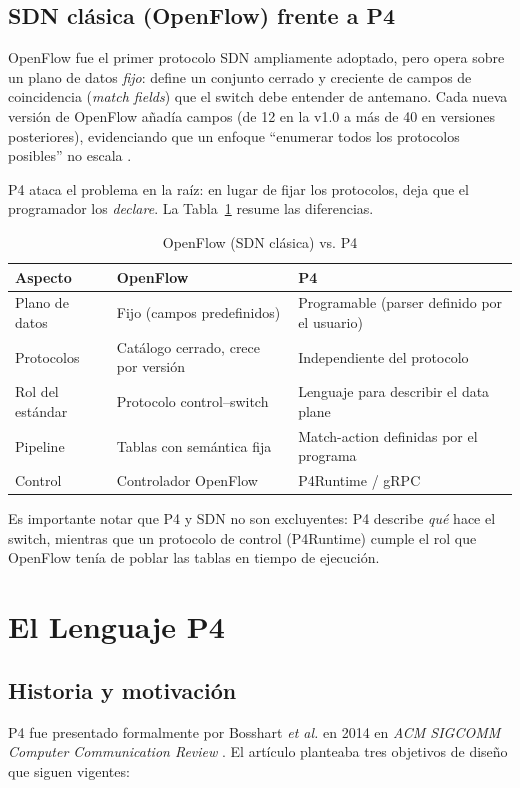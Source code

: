 \documentclass[conference,onecolumn,10pt]{IEEEtran}
\begin{document}
\subsection{SDN clásica (OpenFlow) frente a P4}
OpenFlow fue el primer protocolo SDN ampliamente adoptado, pero opera sobre un
plano de datos \emph{fijo}: define un conjunto cerrado y creciente de campos de
coincidencia (\emph{match fields}) que el switch debe entender de antemano. Cada
nueva versión de OpenFlow añadía campos (de 12 en la v1.0 a más de 40 en
versiones posteriores), evidenciando que un enfoque ``enumerar todos los
protocolos posibles'' no escala \cite{bosshart2014p4}.

P4 ataca el problema en la raíz: en lugar de fijar los protocolos, deja que el
programador los \emph{declare}. La Tabla~\ref{tab:openflow-p4} resume las
diferencias.

\begin{table}[t]
\caption{OpenFlow (SDN clásica) vs. P4}
\label{tab:openflow-p4}
\centering
\small
\begin{tabular}{@{}p{2.4cm}p{2.5cm}p{2.6cm}@{}}
\toprule
\textbf{Aspecto} & \textbf{OpenFlow} & \textbf{P4} \\
\midrule
Plano de datos & Fijo (campos predefinidos) & Programable (parser definido por el usuario) \\
Protocolos & Catálogo cerrado, crece por versión & Independiente del protocolo \\
Rol del estándar & Protocolo control--switch & Lenguaje para describir el data plane \\
Pipeline & Tablas con semántica fija & Match-action definidas por el programa \\
Control & Controlador OpenFlow & P4Runtime / gRPC \\
\bottomrule
\end{tabular}
\end{table}

Es importante notar que P4 y SDN no son excluyentes: P4 describe \emph{qué} hace
el switch, mientras que un protocolo de control (P4Runtime) cumple el rol que
OpenFlow tenía de poblar las tablas en tiempo de ejecución.

\section{El Lenguaje P4}

\subsection{Historia y motivación}
P4 fue presentado formalmente por Bosshart \emph{et al.} en 2014 en \emph{ACM
SIGCOMM Computer Communication Review} \cite{bosshart2014p4}. El artículo
planteaba tres objetivos de diseño que siguen vigentes:
\end{document}
